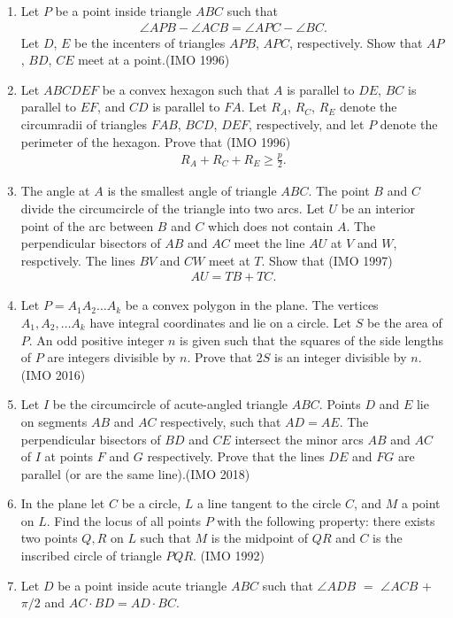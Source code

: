 \begin{enumerate}[label=\thesubsection.\arabic*,ref=\thesubsection.\theenumi]
\item Let $P$ be a point inside triangle $ABC$ such     that                                         
\begin{align*}                                      
	\angle{APB}-\angle{ACB}=\angle{APC}-\angle{ BC}.
 \end{align*}                                       
Let $D$, $E$ be the incenters of triangles $APB$, $APC$, respectively. Show that $AP$, $BD$, $CE$ meet at a point.\hfill(IMO  1996)
\item Let $ABCDEF$ be a convex hexagon such that $A$ is parallel to $DE$, $BC$ is parallel to $EF$, and $CD$ is parallel to $FA$. Let $R_A$, $R_C$, $R_E$ denote the circumradii of triangles $FAB$, $BCD$, $DEF$, respectively, and let $P$ denote the perimeter of the hexagon. Prove that            \hfill(IMO  1996)
\begin{align*}                                            R_A+R_C+R_E\geq\frac{p}{2}.  
\end{align*}
\item The angle at $A$ is the smallest angle of triangle $ABC$. The point $B$ and $C$ divide the circumcircle of the triangle into two arcs. Let $U$ be an interior point of the arc between $B$ and $C$ which does not contain $A$. The perpendicular bisectors of  $AB$ and $AC$ meet the line $AU$ at $V$ and $W$, respctively. The lines $BV$ and $CW$ meet at $T$. Show that
\hfill(IMO  1997)
 \begin{align*}
AU=TB+TC.
 \end{align*}                                   
\item Let $P=A_1A_2 \dots A_k$ be a convex polygon in the plane. The vertices $A_1, A_2,\dots A_k $ have integral coordinates and lie on a circle. Let $S$ be the area of $P$. An odd positive integer $n$ is given such that the squares of the side lengths of $P$ are integers divisible by $n$. Prove that $2S$ is an integer divisible by $n$.\hfill(IMO  2016)
\item Let $I$ be the circumcircle of acute-angled triangle $ABC$. Points $D$ and $E$     lie on segments $AB$ and $AC$ respectively, such that $AD=AE$. The perpendicular bisectors of $BD$ and $CE$ intersect the minor arcs $AB$ and $AC$ of $I$ at points $F$ and $G$ respectively. Prove that the lines $DE$ and $FG$ are parallel (or are the same line).\hfill (IMO  2018)
\item In the plane let $C$ be a circle, $L$ a line  tangent to the circle $C$, and $M$ a point on $L$. Find the locus of all points $P$ with the following property: there exists two points $Q,R$ on $L$ such that $M$ is the midpoint of $QR$ and $C$ is the inscribed circle of triangle $PQR$.  \hfill(IMO  1992)
\item Let $D$ be a point inside acute triangle $ABC$ such that $\angle ADB$ $=$ $\angle ACB$ $+$ $\pi/2$ and $AC \cdot BD = AD \cdot BC$.
 

\end{enumerate}
